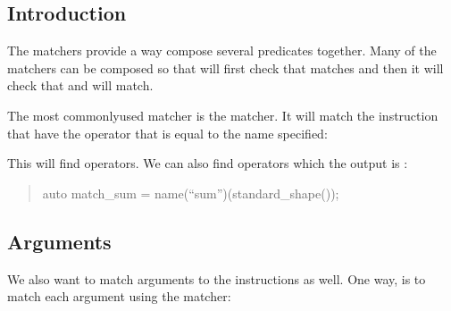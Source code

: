 \documentclass[letterpaper,10pt,english]{sphinxmanual}
\begin{document}
\subsection{Introduction}
\label{\detokenize{dev/matchers:introduction}}
\sphinxAtStartPar
The matchers provide a way compose several predicates together. Many of the matchers can be composed so that  will first check that  matches and then it will check that  and  will match.

\sphinxAtStartPar
The most commonly\sphinxhyphen{}used matcher is the  matcher. It will match the instruction that have the operator that is equal to the name specified:

\begin{sphinxVerbatim}[commandchars=\\\{\}]
\end{sphinxVerbatim}

\sphinxAtStartPar
This will find  operators. We can also find  operators which the output is :
\begin{quote}

\sphinxAtStartPar
auto match\_sum = name(“sum”)(standard\_shape());
\end{quote}


\subsection{Arguments}
\label{\detokenize{dev/matchers:arguments}}
\sphinxAtStartPar
We also want to match arguments to the instructions as well. One way, is to match each argument using the  matcher:

\begin{sphinxVerbatim}[commandchars=\\\{\}]
\end{sphinxVerbatim}
\end{document}
